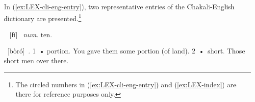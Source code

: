 \begin{center} 
\end{center}

 
In (\ref{ex:LEX-cli-eng-entry}), two representative entries
of the Chakali-English dictionary are presented.\footnote{The circled numbers
in (\ref{ex:LEX-cli-eng-entry})  and (\ref{ex:LEX-index}) are there for
reference purposes only.}



\begin{exe}
\ex\label{ex:LEX-cli-eng-entry}
\begin{xlist}
\ex
{} 	[fí]  {\it num}. ten.

\ex
{} [bòró] . 1 •
portion.  You gave
them some portion (of land). 2 • short.  Those short men over there.
\end{xlist}
\end{exe}

